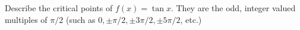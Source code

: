 {Describe the critical points of $f(x) = \tan x$.
}
{They are the odd, integer valued multiples of $\pi/2$ (such as $0, \pm\pi/2, \pm 3\pi/2, \pm5\pi/2$, etc.)
}
